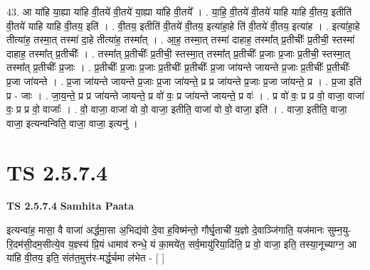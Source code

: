 \documentclass[17pt]{extarticle}
\begin{document}
43. आ या॑हि या॒ह्या या॑हि वी॒तये॑ वी॒तये॑ या॒ह्या या॑हि वी॒तये᳚ । . या॒हि॒ वी॒तये॑ वी॒तये॑ याहि याहि वी॒तय॒ इतीति॑ वी॒तये॑ याहि याहि वी॒तय॒ इति॑ । . वी॒तय॒ इतीति॑ वी॒तये॑ वी॒तय॒ इत्या॑हा॒हे ति॑ वी॒तये॑ वी॒तय॒ इत्या॑ह । . इत्या॑हा॒हे तीत्या॑ह॒ तस्मा॒त् तस्मा॑ दा॒हे तीत्या॑ह॒ तस्मा᳚त् । . आ॒ह॒ तस्मा॒त् तस्मा॑ दाहाह॒ तस्मा᳚त् प्र॒तीचीः᳚ प्र॒तीची॒ स्तस्मा॑ दाहाह॒ तस्मा᳚त् प्र॒तीचीः᳚ । . तस्मा᳚त् प्र॒तीचीः᳚ प्र॒तीची॒ स्तस्मा॒त् तस्मा᳚त् प्र॒तीचीः᳚ प्र॒जाः प्र॒जाः प्र॒तीची॒ स्तस्मा॒त् तस्मा᳚त् प्र॒तीचीः᳚ प्र॒जाः । . प्र॒तीचीः᳚ प्र॒जाः प्र॒जाः प्र॒तीचीः᳚ प्र॒तीचीः᳚ प्र॒जा जा॑यन्ते जायन्ते प्र॒जाः प्र॒तीचीः᳚ प्र॒तीचीः᳚ प्र॒जा जा॑यन्ते । . प्र॒जा जा॑यन्ते जायन्ते प्र॒जाः प्र॒जा जा॑यन्ते॒ प्र प्र जा॑यन्ते प्र॒जाः प्र॒जा जा॑यन्ते॒ प्र । . प्र॒जा इति॑ प्र - जाः । . जा॒य॒न्ते॒ प्र प्र जा॑यन्ते जायन्ते॒ प्र वो॑ वः॒ प्र जा॑यन्ते जायन्ते॒ प्र वः॑ । . प्र वो॑ वः॒ प्र प्र वो॒ वाजा॒ वाजा॑ वः॒ प्र प्र वो॒ वाजाः᳚ । . वो॒ वाजा॒ वाजा॑ वो वो॒ वाजा॒ इतीति॒ वाजा॑ वो वो॒ वाजा॒ इति॑ । . वाजा॒ इतीति॒ वाजा॒ वाजा॒ इत्यन्वन्विति॒ वाजा॒ वाजा॒ इत्यनु॑ । \newline
\pagebreak
{}

\section{ TS 2.5.7.4 }

\textbf{TS 2.5.7.4 } \newline
\textbf{Samhita Paata} \newline

इत्यन्वा॑ह॒ मासा॒ वै वाजा॑ अर्द्धमा॒सा अ॒भिद्य॑वो दे॒वा ह॒विष्म॑न्तो॒ गौर्घृ॒ताची॑ य॒ज्ञो दे॒वाञ्जि॑गाति॒ यज॑मानः सुम्न॒यु-रि॒दम॑सी॒दम॒सीत्ये॒व य॒ज्ञ्स्य॑ प्रि॒यं धामाव॑ रुन्धे॒ यं का॒मये॑त॒ सर्व॒मायु॑रिया॒दिति॒ प्र वो॒ वाजा॒ इति॒ तस्या॒नूच्याग्न॒ आ या॑हि वी॒तय॒ इति॒ संत॑त॒मुत्त॑र-मर्द्ध॒र्चमा ल॑भेत - [  ] \newline
\end{document}
